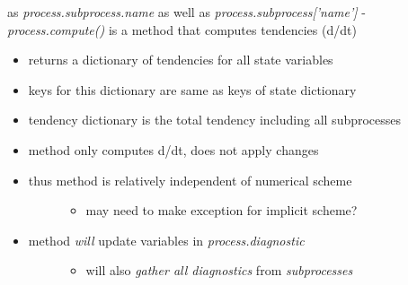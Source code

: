 \documentclass[letterpaper,10pt,english]{sphinxmanual}
\begin{document}
as \emph{process.subprocess.name} as well as \emph{process.subprocess{[}'name'{]}}
- \emph{process.compute()} is a method that computes tendencies (d/dt)
\begin{itemize}
\item {} 
returns a dictionary of tendencies for all state variables

\item {} 
keys for this dictionary are same as keys of state dictionary

\item {} 
tendency dictionary is the total tendency including all subprocesses

\item {} 
method only computes d/dt, does not apply changes

\item {} \begin{description}
\item[{thus method is relatively independent of numerical scheme}] \leavevmode\begin{itemize}
\item {} 
may need to make exception for implicit scheme?

\end{itemize}

\end{description}

\item {} \begin{description}
\item[{method \emph{will} update variables in \emph{process.diagnostic}}] \leavevmode\begin{itemize}
\item {} 
will also \emph{gather all diagnostics} from \emph{subprocesses}

\end{itemize}

\end{description}

\end{itemize}
\end{document}
